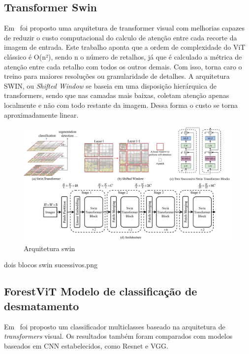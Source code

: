 \subsection{Transformer Swin}\label{sec:Cap2_Swin}

Em~\cite{} foi proposto uma arquitetura de transformer visual com melhorias capazes de reduzir o custo computacional do calculo de atenção entre cada recorte da imagem de entrada. Este trabalho aponta que a ordem de complexidade do ViT clássico é O(n²), sendo n o número de retalhos, já que é calculado a métrica de atenção entre cada retalho com todos os outros demais. Com isso, torna caro o treino para maiores resoluções ou granularidade de detalhes. A arquitetura SWIN, ou \textit{Shifted Window} se baseia em uma disposição hierárquica de transformers, sendo que nas camadas mais baixas, coletam atenção apenas localmente e não com todo restante da imagem. Dessa forma o custo se torna aproximadamente linear. 


\begin{figure}[!ht]
    \centering
    \includegraphics[width=\columnwidth]{Imagens/arquitetura swin.png}
    \caption{Arquitetura swin ~\cite{liu2022swin}}
    \label{fig:SWIN-arquitetura}
\end{figure}

dois blocos swin sucessivos.png

\subsection{ForestViT Modelo de classificação de desmatamento}\label{sec:Cap2_ForestViT}

Em~\cite{9701667} foi proposto um classificador multiclasses baseado na arquitetura de \textit{transformers} visual. Os resultados também foram comparados com modelos baseados em CNN estabelecidos, como Resnet e VGG. 


